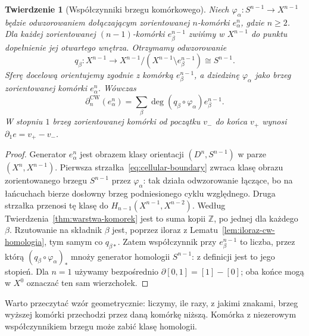 \documentclass[11pt,a4paper,oneside]{report}
\newcommand{\Z}{\mathbb{Z}}
\theoremstyle{plain}
\newtheorem{twierdzenie}{Twierdzenie}[section]
\theoremstyle{definition}
\theoremstyle{remark}
\begin{document}
\begin{twierdzenie}[Współczynniki brzegu komórkowego]
\label{thm:formula-komorkowa}
Niech $\varphi_\alpha:S^{n-1}\to X^{n-1}$
będzie odwzorowaniem dołączającym
zorientowanej $n$-komórki
$e_\alpha^n$, gdzie $n\geq2$.
Dla każdej zorientowanej
$(n-1)$-komórki $e_\beta^{n-1}$
zwińmy w $X^{n-1}$ do punktu
dopełnienie jej otwartego wnętrza.
Otrzymamy odwzorowanie
\[
 q_\beta:X^{n-1}\longrightarrow
 X^{n-1}/(X^{n-1}\setminus e_\beta^{n-1})
 \cong S^{n-1}.
\]
Sferę docelową orientujemy zgodnie z komórką $e_\beta^{n-1}$,
a dziedzinę $\varphi_\alpha$ jako brzeg zorientowanej komórki $e_\alpha^n$.
Wówczas
\begin{equation}\label{eq:formula-komorkowa}
 \partial_n^{\mathrm{CW}}(e_\alpha^n)
 =\sum_{\beta}
 \deg(q_\beta\circ\varphi_\alpha)
 e_\beta^{n-1}.
\end{equation}
W stopniu $1$ brzeg zorientowanej
komórki od początku $v_-$ do końca
$v_+$ wynosi $\partial_1e=v_+-v_-$.
\end{twierdzenie}
\begin{proof}
Generator $e_\alpha^n$ jest
obrazem klasy orientacji
$(D^n,S^{n-1})$ w parze
$(X^n,X^{n-1})$. Pierwsza
strzałka~\eqref{eq:cellular-boundary}
zwraca klasę obrazu
zorientowanego brzegu $S^{n-1}$
przez $\varphi_\alpha$:
tak działa odwzorowanie łączące,
bo na łańcuchach bierze
dosłowny brzeg podniesionego
cyklu względnego.
Druga strzałka przenosi tę
klasę do
$H_{n-1}(X^{n-1},X^{n-2})$.
Według
Twierdzenia~\ref{thm:warstwa-komorek}
jest to suma kopii $\Z$,
po jednej dla każdego $\beta$.
Rzutowanie na składnik $\beta$
jest, poprzez iloraz z
Lematu~\ref{lem:iloraz-cw-homologia},
tym samym co $q_{\beta*}$.
Zatem współczynnik przy
$e_\beta^{n-1}$ to liczba,
przez którą
$(q_\beta\circ\varphi_\alpha)_*$
mnoży generator homologii
$S^{n-1}$: z definicji
jest to jego stopień.
Dla $n=1$ używamy
bezpośrednio
$\partial[0,1]=[1]-[0]$;
oba końce mogą w $X^0$
oznaczać ten sam wierzchołek.
\end{proof}

Warto przeczytać wzór geometrycznie:
liczymy, ile razy, z jakimi znakami,
brzeg wyższej komórki przechodzi
przez daną komórkę niższą. Komórka
z niezerowym współczynnikiem brzegu
może zabić klasę homologii.
\end{document}
